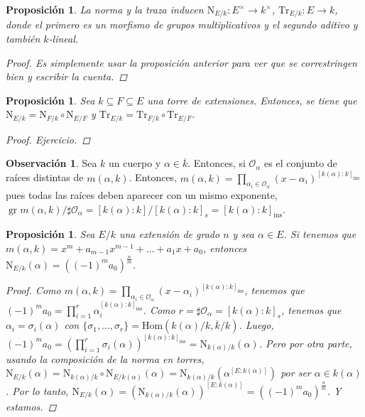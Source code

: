 \documentclass[12pt]{book}
\newtheorem{prop}[teo]{Proposición}
\theoremstyle{definition}
\newtheorem{obs}[teo]{Observación}
\renewcommand{\hom}{\mathrm{Hom}}
\DeclareMathOperator{\gr}{gr}
\begin{document}
\begin{prop}
La norma y la traza inducen $\mathrm{N}_{E/k}:E^\times\to k^\times$, $\mathrm{Tr}_{E/k}:E\to k$, donde el primero es un morfismo de grupos multiplicativos y el segundo aditivo y también $k$-lineal.
\begin{proof}
Es simplemente usar la proposición anterior para ver que se correstringen bien y escribir la cuenta.
\end{proof}
\end{prop}

\begin{prop}
Sea $k\subseteq F\subseteq E$ una torre de extensiones. Entonces, se tiene que $\mathrm{N}_{E/k} = \mathrm{N}_{F/k}\circ\mathrm{N}_{E/F}$ y $\mathrm{Tr}_{E/k} = \mathrm{Tr}_{F/k}\circ\mathrm{Tr}_{E/F}$.
\begin{proof}
Ejercicio.
\end{proof}
\end{prop}

\begin{obs}
Sea $k$ un cuerpo y $\alpha\in \overline{k}$. Entonces, si $\mathcal{O}_\alpha$ es el conjunto de raíces distintas de $m(\alpha,k)$. Entonces, $m(\alpha,k) = \displaystyle\prod_{\alpha_i\in\mathcal{O}_\alpha} (x-\alpha_i)^{[k(\alpha):k]_{\text{ins}}}$ pues todas las raíces deben aparecer con un mismo exponente, $\gr m(\alpha,k)/\sharp\mathcal{O}_\alpha = [k(\alpha):k]/[k(\alpha):k]_s  =[k(\alpha):k]_{\text{ins}}$.
\end{obs}

\begin{prop}
Sea $E/k$ una extensión de grado $n$ y sea $\alpha\in E$. Si tenemos que $m(\alpha,k)=x^m + a_{m-1}x^{m-1}+\ldots + a_1x+a_0$, entonces $\mathrm{N}_{E/k}(\alpha) = ((-1)^m a_0)^{\frac{n}{m}}$.
\begin{proof}
Como $m(\alpha,k) = \displaystyle\prod_{\alpha_i\in\mathcal{O}_\alpha} (x-\alpha_i)^{[k(\alpha):k]_{\text{ins}}}$, tenemos que $(-1)^{m}a_0 = \displaystyle\prod_{i=1}^r \alpha_i^{[k(\alpha):k]_{\text{ins}}}$. Como $r=\sharp\mathcal{O}_\alpha = [k(\alpha):k]_s$, tenemos que $\alpha_i = \sigma_i(\alpha)$ con $\{\sigma_1,\ldots , \sigma_r\} = \hom(k(\alpha)/k,\overline{k}/k)$. Luego, $(-1)^m a_0 = \left(\displaystyle\prod_{i=1}^r \sigma_i(\alpha)\right)^{[k(\alpha):k]_{\text{ins}}} = \mathrm{N}_{k(\alpha)/k}(\alpha)$. Pero por otra parte, usando la composición de la norma en torres, $\mathrm{N}_{E/k}(\alpha)=\mathrm{N}_{k(\alpha)/k}\circ\mathrm{N}_{E/k(\alpha)}(\alpha) = \mathrm{N}_{k(\alpha)/k}(\alpha^{[E:k(\alpha)]})$ por ser $\alpha\in k(\alpha)$. Por lo tanto, $\mathrm{N}_{E/k}(\alpha) = (\mathrm{N}_{k(\alpha)/k}(\alpha))^{[E:k(\alpha)]} = ((-1)^m a_0)^{\frac{n}{m}}$. Y estamos. 
\end{proof}
\end{prop}
\end{document}
